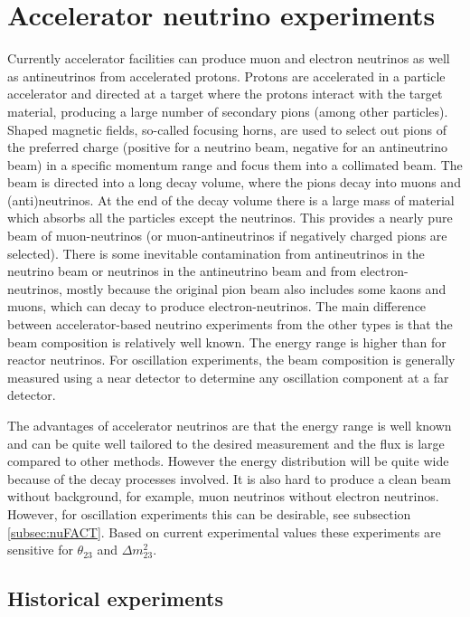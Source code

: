 \pagebreak
\newpage
\section{Accelerator neutrino experiments}
Currently accelerator facilities can produce muon and electron neutrinos as well as antineutrinos from accelerated protons. Protons are accelerated in a particle accelerator and directed at a target where the protons interact with the target material, producing a large number of secondary pions (among other particles). Shaped magnetic fields, so-called focusing horns, are used to select out pions of the preferred charge (positive for a neutrino beam, negative for an antineutrino beam) in a specific momentum range and focus them into a collimated beam. The beam is directed into a long decay volume, where the pions decay into muons and (anti)neutrinos. At the end of the decay volume there is a large mass of material which absorbs all the particles except the neutrinos. This provides a nearly pure beam of muon-neutrinos (or muon-antineutrinos if negatively charged pions are selected). There is some inevitable contamination from antineutrinos in the neutrino beam or neutrinos in the antineutrino beam and from electron-neutrinos, mostly because the original pion beam also includes some kaons and muons, which can decay to produce electron-neutrinos. The main difference between accelerator-based neutrino experiments from the other types is that the beam composition is relatively well known. The energy range is higher than for reactor neutrinos. For oscillation experiments, the beam composition is generally measured using a near detector to determine any oscillation component at a far detector.

The advantages of accelerator neutrinos are that the energy range is well known and can be quite well tailored to the desired measurement and the flux is large compared to other methods. However the energy distribution will be quite wide because of the decay processes involved. It is also hard to produce a clean beam without background, for example, muon neutrinos without electron neutrinos. However, for oscillation experiments this can be desirable, see subsection \ref{subsec:nuFACT}. Based on current experimental values these experiments are sensitive for $\theta_{23}$ and $\Delta m_{23}^2 $.

\subsection{Historical experiments}

